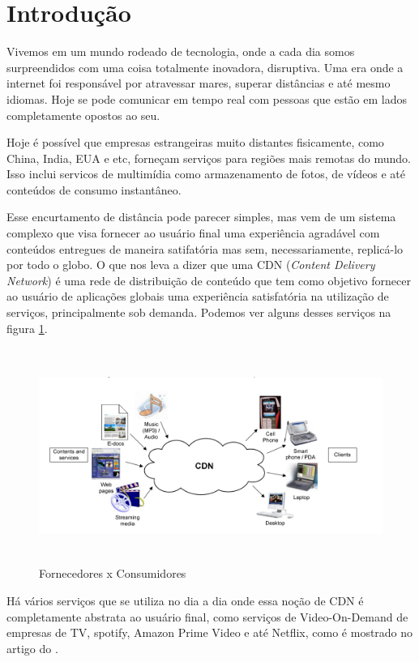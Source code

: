 \section{Introdu\c{c}\~ao}

Vivemos em um mundo rodeado de tecnologia, onde a cada dia somos surpreendidos com uma coisa totalmente inovadora, disruptiva. Uma era onde a internet foi respons\'avel por atravessar mares, superar dist\^ancias e at\'e mesmo idiomas. Hoje se pode comunicar em tempo real com pessoas que est\~ao em lados completamente opostos ao seu. 

Hoje \'e poss\'ivel que empresas estrangeiras muito distantes fisicamente, como China, India, EUA e etc, forne\c{c}am servi\c{c}os para regi\~oes mais remotas do mundo. Isso inclui servi{c}os de multim\'idia como armazenamento de fotos, de v\'ideos e at\'e conte\'udos de consumo instant\^aneo.

Esse encurtamento de dist\^ancia pode parecer simples, mas vem de um sistema complexo que visa fornecer ao usu\'ario final uma experi\^encia agrad\'avel com conte\'udos entregues de maneira satifat\'oria mas sem, necessariamente, replic\'a-lo por todo o globo. O que nos leva a dizer que uma CDN (\textit{Content Delivery Network}) \'e uma rede de distribui\c{c}\~ao de conte\'udo que tem como objetivo fornecer ao usu\'ario de aplica\c{c}\~oes globais uma experi\^encia satisfat\'oria na utiliza\c{c}\~ao de servi\c{c}os, principalmente sob demanda. Podemos ver alguns desses servi\c{c}os na figura \ref{figura:contextualizacao}.
\begin{figure}[H]
\includegraphics[height=7cm]{Figuras/contextualizacao.png}
\caption{Fornecedores x Consumidores} 
\label{figura:contextualizacao} 
\end{figure}
H\'a v\'arios servi\c{c}os que se utiliza no dia a dia onde essa no\c{c}\~ao de CDN \'e completamente abstrata ao usu\'ario final, como servi\c{c}os de Video-On-Demand de empresas de TV, spotify, Amazon Prime Video e at\'e Netflix, como \'e mostrado no artigo do \cite{adhikari2012unreeling}.

